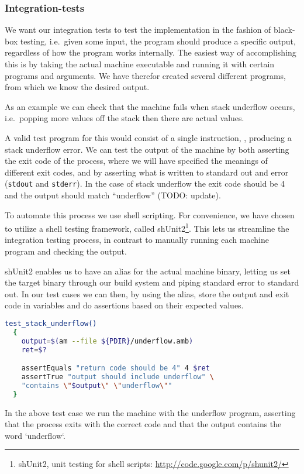 \subsubsection{Integration-tests}

We want our integration tests to test the implementation in the fashion of
black-box testing, i.e.~given some input, the program should produce a specific
output, regardless of how the program works internally. The easiest way of
accomplishing this is by taking the actual machine executable and running it
with certain programs and arguments. We have therefor created several different
programs, from which we know the desired output.

As an example we can check that the machine fails when stack underflow occurs,
i.e.\ popping more values off the stack then there are actual values.

A valid test program for this would consist of a single instruction, , producing a stack underflow error. We can test the output of the machine
by both asserting the exit code of the process, where we will have specified the
meanings of different exit codes, and by asserting what is written to standard
out and error ({\tt stdout} and {\tt stderr}). In the case of stack underflow
the exit code should be 4 and the output should match ``underflow'' (TODO:
update).

To automate this process we use shell scripting. For convenience, we have chosen
to utilize a shell testing framework, called shUnit2\footnote{shUnit2, unit
  testing for shell scripts: \url{http://code.google.com/p/shunit2/}}. This lets
us streamline the integration testing process, in contrast to manually running
each machine program and checking the output.

shUnit2 enables us to have an alias for the actual machine binary, letting us
set the target binary through our build system and piping standard error to
standard out. In our test cases we can then, by using the alias, store the
output and exit code in variables and do assertions based on their expected
values.
\begin{lstlisting}[language={sh},caption={shUnit2 underflow test case}]
  test_stack_underflow()
  {
    output=$(am --file ${PDIR}/underflow.amb)
    ret=$?

    assertEquals "return code should be 4" 4 $ret
    assertTrue "output should include underflow" \
    "contains \"$output\" \"underflow\""
  }
\end{lstlisting}

In the above test case we run the machine with the underflow program, asserting
that the process exits with the correct code and that the output contains the
word `underflow`.
